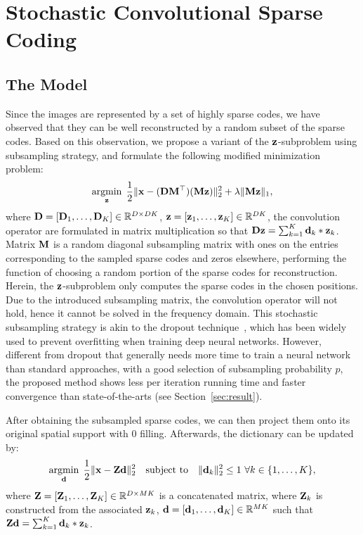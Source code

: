 \section{Stochastic Convolutional Sparse Coding}
\subsection{The Model}
Since the images are represented by a set of highly sparse codes, we have observed that they can be well reconstructed by a random subset of the sparse codes. Based on this observation, we propose a variant of the $\code$-subproblem using subsampling strategy, and formulate the following modified minimization problem:
\begin{equation} \label{eq:updatingCode}
    \minimize{\code} \frac{1}{2}\|\signal - (\Filter \mask^\top)(\mask \code) \|_2^2 + \lambda \|\mask \code\|_1,
\end{equation}
where $\Filter = [\Filter_1, \dots, \Filter_K] \in \mathbb{R}^{D \times DK}$, $\code = [\code_1, \dots, \code_K] \in \mathbb{R}^{DK}$, the convolution operator are formulated in matrix multiplication so that $ \Filter \code = \sum_{k=1}^{K} \filter_k * \code_k$.  Matrix $\mask$ is a random diagonal subsampling matrix with ones on the entries corresponding to the sampled sparse codes and zeros elsewhere, performing the function of choosing a random portion of the sparse codes for reconstruction. Herein, the $\code$-subproblem only computes the sparse codes in the chosen positions. Due to the introduced subsampling matrix, the convolution operator will not hold, hence it cannot be solved in the frequency domain. This stochastic subsampling strategy is akin to the dropout technique~\cite{srivastava2014dropout}, which has been widely used to prevent overfitting when training deep neural networks. However, different from dropout that generally needs more time to train a neural network than standard approaches, with a good selection of subsampling probability $p$, the proposed method shows less per iteration running time and faster convergence than state-of-the-arts (see Section~\ref{sec:result}).

After obtaining the subsampled sparse codes, we can then project them onto its original spatial support with $0$ filling. Afterwards, the dictionary can be updated by:
\begin{equation} \label{eq:updatingFilter}
    \minimize{\filter} \frac{1}{2}\|\signal - \Code \filter \|_2^2 \quad \text{subject to} \quad \|\filter_k\|^2_2 \leq 1 ~ \forall k \in \{1,\dots,K\},
\end{equation}
where $\Code= [\Code_1, \dots, \Code_K] \in \mathbb{R}^{D \times MK}$ is a concatenated matrix, where $\Code_k$ is constructed from the associated $\code_k$, $\filter= [\filter_1,\dots,\filter_K] \in \mathbb{R}^{MK}$ such that $ \Code \filter = \sum_{k=1}^{K} \filter_k * \code_k$.

